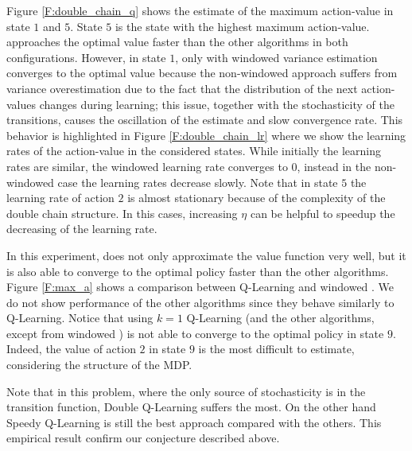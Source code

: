 \documentclass[conference]{IEEEtran}
\begin{document}
Figure \ref{F:double_chain_q} shows the estimate of the maximum action-value in state $1$ and $5$. State $5$ is the state with the highest maximum action-value. \alg approaches the optimal value faster than the other algorithms in both configurations. However, in state $1$, only \alg with windowed variance estimation converges to the optimal value because the non-windowed approach suffers from variance overestimation due to the fact that the distribution of the next action-values changes during learning; this issue, together with the stochasticity of the transitions, causes the oscillation of the estimate and slow convergence rate. This behavior is highlighted in Figure \ref{F:double_chain_lr} where we show the learning rates of the action-value in the considered states. While initially the learning rates are similar, the windowed learning rate converges to $0$, instead in the non-windowed case the learning rates decrease slowly. Note that in state $5$ the learning rate of action $2$ is almost stationary because of the complexity of the double chain structure. In this cases, increasing $\eta$ can be helpful to speedup the decreasing of the learning rate.

In this experiment, \alg does not only approximate the value function very well, but it is also able to converge to the optimal policy faster than the other algorithms. Figure \ref{F:max_a} shows a comparison between Q-Learning and windowed \alg. We do not show performance of the other algorithms since they behave similarly to Q-Learning. Notice that using $k = 1$ Q-Learning (and the other algorithms, except from windowed \alg) is not able to converge to the optimal policy in state $9$. Indeed, the value of action $2$ in state $9$ is the most difficult to estimate, considering the structure of the MDP.

Note that in this problem, where the only source of stochasticity is in the transition function, Double Q-Learning suffers the most. On the other hand Speedy Q-Learning is still the best approach compared with the others. This empirical result confirm our conjecture described above.
\end{document}
